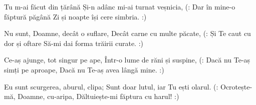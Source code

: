 \beginverse
Tu m-ai făcut din țărână
Și-n adânc mi-ai turnat veșnicia,
(: Dar în mine-o făptură păgână
Zi și noapte își cere simbria. :)
\endverse

\beginverse
Nu sunt, Doamne, decât o suflare,
Decât carne cu multe păcate,
(: Și Te caut cu dor și oftare
Să-mi dai forma trăirii curate. :)
\endverse

\beginverse
Ce-aș ajunge, tot singur pe ape,
Într-o lume de răni și suspine,
(: Dacă nu Te-aș simți pe aproape,
Dacă nu Te-aș avea lângă mine. :)
\endverse

\beginverse
Eu sunt scurgerea, aburul, clipa;
Sunt doar lutul, iar Tu ești olarul.
(: Ocrotește-mă, Doamne, cu-aripa,
Dăltuiește-mi făptura cu harul! :)
\endverse
\endsong